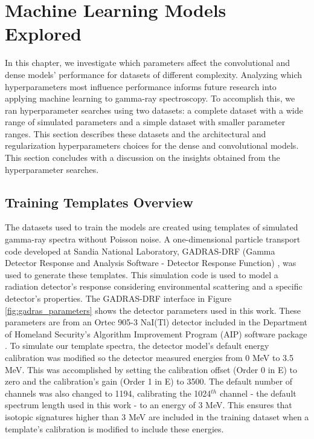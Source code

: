 \chapter{Machine Learning Models Explored} \label{ChapterMachineLearningModelsExplored}

In this chapter, we investigate which parameters affect the convolutional and dense models' performance for datasets of different complexity. Analyzing which hyperparameters most influence performance informs future research into applying machine learning to gamma-ray spectroscopy. To accomplish this, we ran hyperparameter searches using two datasets: a complete dataset with a wide range of simulated parameters and a simple dataset with smaller parameter ranges. This section describes these datasets and the architectural and regularization hyperparameters choices for the dense and convolutional models. This section concludes with a discussion on the insights obtained from the hyperparameter searches.



\section{Training Templates Overview}

The datasets used to train the models are created using templates of simulated gamma-ray spectra without Poisson noise. A one-dimensional particle transport code developed at Sandia National Laboratory, GADRAS-DRF (Gamma Detector Response and Analysis Software - Detector Response Function) \cite{mitchell2014}, was used to generate these templates. This simulation code is used to model a radiation detector's response considering environmental scattering and a specific  detector's properties. The GADRAS-DRF interface in Figure \ref{fig:gadras_parameters} shows the detector parameters used in this work. These parameters are from an Ortec 905-3 NaI(Tl) detector included in the Department of Homeland Security's Algorithm Improvement Program (AIP) software package \cite{DHSAIP}. To simulate our template spectra, the detector model's default energy calibration was modified so the detector measured energies from 0 MeV to 3.5 MeV. This was accomplished by setting the calibration offset (Order 0 in E) to zero and the calibration's gain (Order 1 in E) to 3500. The default number of channels was also changed to 1194, calibrating the 1024$^{th}$ channel - the default spectrum length used in this work - to an energy of 3 MeV. This ensures that isotopic signatures higher than 3 MeV are included in the training dataset when a template's calibration is modified to include these energies.

